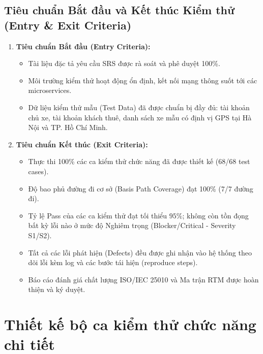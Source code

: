 \documentclass[12pt,a4paper,oneside]{report}
\begin{document}
\section{Tiêu chuẩn Bắt đầu và Kết thúc Kiểm thử (Entry \& Exit Criteria)}
\begin{enumerate}
  \item \textbf{Tiêu chuẩn Bắt đầu (Entry Criteria):}
    \begin{itemize}
      \item Tài liệu đặc tả yêu cầu SRS được rà soát và phê duyệt 100\%.
      \item Môi trường kiểm thử hoạt động ổn định, kết nối mạng thông suốt tới các microservices.
      \item Dữ liệu kiểm thử mẫu (Test Data) đã được chuẩn bị đầy đủ: tài khoản chủ xe, tài khoản khách thuê, danh sách xe mẫu có định vị GPS tại Hà Nội và TP. Hồ Chí Minh.
    \end{itemize}
  \item \textbf{Tiêu chuẩn Kết thúc (Exit Criteria):}
    \begin{itemize}
      \item Thực thi 100\% các ca kiểm thử chức năng đã được thiết kế (68/68 test cases).
      \item Độ bao phủ đường đi cơ sở (Basis Path Coverage) đạt 100\% (7/7 đường đi).
      \item Tỷ lệ Pass của các ca kiểm thử đạt tối thiểu $95\%$; không còn tồn đọng bất kỳ lỗi nào ở mức độ Nghiêm trọng (Blocker/Critical - Severity S1/S2).
      \item Tất cả các lỗi phát hiện (Defects) đều được ghi nhận vào hệ thống theo dõi lỗi kèm log và các bước tái hiện (reproduce steps).
      \item Báo cáo đánh giá chất lượng ISO/IEC 25010 và Ma trận RTM được hoàn thiện và ký duyệt.
    \end{itemize}
\end{enumerate}

\chapter{Thiết kế bộ ca kiểm thử chức năng chi tiết}
\end{document}

